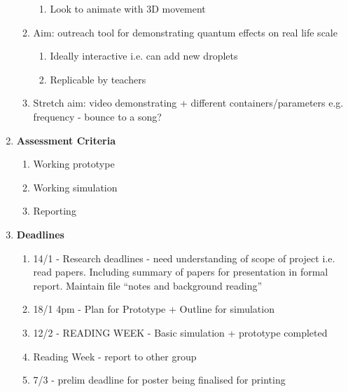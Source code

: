 \begin{enumerate}
\begin{enumerate}
\begin{enumerate}
\item  Look to animate with 3D movement
\end{enumerate}

\item  Aim: outreach tool for demonstrating quantum effects on real life scale

\begin{enumerate}
\item  Ideally interactive i.e. can add new droplets

\item  Replicable by teachers
\end{enumerate}

\item  Stretch aim: video demonstrating + different containers/parameters e.g. frequency - bounce to a song?\\
\end{enumerate}

\item  \textbf{Assessment Criteria}

\begin{enumerate}
\item \textbf{ }Working prototype

\item  Working simulation

\item  Reporting\\
\end{enumerate}

\item  \textbf{Deadlines}

\begin{enumerate}
\item \textbf{ }14/1 - Research deadlines - need understanding of scope of project i.e. read papers. Including summary of papers for presentation in formal report. Maintain file ``notes and background reading''

\item  18/1 4pm - Plan for Prototype + Outline for simulation

\item  12/2 - READING WEEK - Basic simulation + prototype completed

\item  Reading Week - report to other group

\item  7/3 - prelim deadline for poster being finalised for printing


\end{enumerate}
\end{enumerate}
